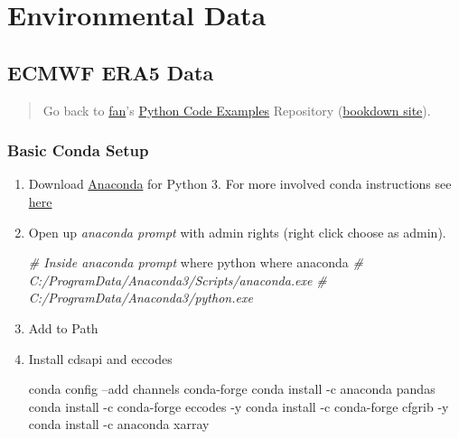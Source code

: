 \documentclass[
]{book}
\newenvironment{Shaded}{\begin{snugshade}}{\end{snugshade}}
\newcommand{\CommentTok}[1]{\textcolor[rgb]{0.56,0.35,0.01}{\textit{#1}}}
\newcommand{\ExtensionTok}[1]{#1}
\newcommand{\NormalTok}[1]{#1}
\begin{document}
\hypertarget{environmental-data}{%
\section{Environmental Data}\label{environmental-data}}

\hypertarget{ecmwf-era5-data}{%
\subsection{ECMWF ERA5 Data}\label{ecmwf-era5-data}}

\begin{quote}
Go back to \href{http://fanwangecon.github.io/}{fan}'s \href{https://fanwangecon.github.io/pyfan/}{Python Code Examples} Repository (\href{https://fanwangecon.github.io/pyfan/bookdown}{bookdown site}).
\end{quote}

\hypertarget{basic-conda-setup}{%
\subsubsection{Basic Conda Setup}\label{basic-conda-setup}}

\begin{enumerate}
\def\labelenumi{\arabic{enumi}.}
\item
  Download \href{https://www.anaconda.com/products/individual}{Anaconda} for Python 3. For more involved conda instructions see \href{https://fanwangecon.github.io/Tex4Econ/nontex/install/windows/fn_installations.html}{here}
\item
  Open up \emph{anaconda prompt} with admin rights (right click choose as admin).

\begin{Shaded}
\begin{Highlighting}[]
\CommentTok{# Inside anaconda prompt}
\ExtensionTok{where}\NormalTok{ python}
\ExtensionTok{where}\NormalTok{ anaconda}
\CommentTok{# C:/ProgramData/Anaconda3/Scripts/anaconda.exe}
\CommentTok{# C:/ProgramData/Anaconda3/python.exe}
\end{Highlighting}
\end{Shaded}
\item
  Add to Path
\item
  Install cdsapi and eccodes

\begin{Shaded}
\begin{Highlighting}[]
\ExtensionTok{conda}\NormalTok{ config --add channels conda-forge}
\ExtensionTok{conda}\NormalTok{ install -c anaconda pandas}
\ExtensionTok{conda}\NormalTok{ install -c conda-forge eccodes -y}
\ExtensionTok{conda}\NormalTok{ install -c conda-forge cfgrib -y}
\ExtensionTok{conda}\NormalTok{ install -c anaconda xarray}
\end{Highlighting}
\end{Shaded}
\end{enumerate}
\end{document}
